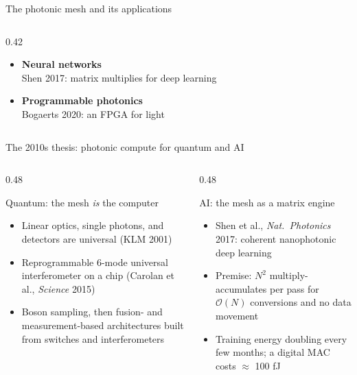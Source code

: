 \documentclass[aspectratio=169,10pt]{beamer}
\begin{document}
\begin{frame}{The photonic mesh and its applications}
\begin{columns}[T]
\begin{column}{0.42\textwidth}
{\begin{itemize}
  \item \textbf{Neural networks} \\ Shen 2017: matrix multiplies for deep learning
  \item \textbf{Programmable photonics} \\ Bogaerts 2020: an FPGA for light
\end{itemize}}
\end{column}
\end{columns}
\end{frame}

\begin{frame}{The 2010s thesis: photonic compute for quantum and AI}
\begin{columns}[T]
\begin{column}{0.48\textwidth}
\begin{block}{Quantum: the mesh \emph{is} the computer}
\footnotesize
\begin{itemize}\setlength{\itemsep}{2pt}
  \item Linear optics, single photons, and detectors are universal (KLM 2001)
  \item Reprogrammable 6-mode universal interferometer on a chip (Carolan et al., \emph{Science} 2015)
  \item Boson sampling, then fusion- and measurement-based architectures built from switches and interferometers
\end{itemize}
\end{block}
\end{column}
\begin{column}{0.48\textwidth}
\begin{block}{AI: the mesh as a matrix engine}
\footnotesize
\begin{itemize}\setlength{\itemsep}{2pt}
  \item Shen et al., \emph{Nat.\ Photonics} 2017: coherent nanophotonic deep learning
  \item Premise: $N^2$ multiply-accumulates per pass for $\mathcal{O}(N)$ conversions and no data movement
  \item Training energy doubling every few months; a digital MAC costs $\approx$ 100 fJ
\end{itemize}
\end{block}
\end{column}

\end{columns}
\end{frame}
\end{document}
